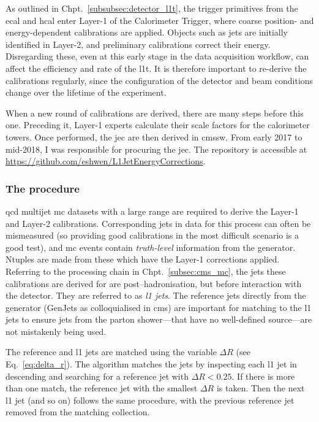 As outlined in Chpt.~\ref{subsubsec:detector_l1t}, the trigger primitives from the \acrshort{ecal} and \acrshort{hcal} enter Layer-1 of the Calorimeter Trigger, where coarse position- and energy-dependent calibrations are applied. Objects such as \glspl{jet} are initially identified in Layer-2, and preliminary calibrations correct their energy. Disregarding these, even at this early stage in the data acquisition workflow, can affect the efficiency and rate of the \acrlong{l1t}. It is therefore important to re-derive the calibrations regularly, since the configuration of the detector and beam conditions change over the lifetime of the experiment.

When a new round of calibrations are derived, there are many steps before this one. Preceding it, Layer-1 experts calculate their scale factors for the calorimeter towers. Once performed, the \acrlong{jec} are then derived in \acrshort{cmssw}. From early 2017 to mid-2018, I was responsible for procuring the \acrshort{jec}. The repository is accessible at \url{https://github.com/eshwen/L1JetEnergyCorrections}.




\subsubsection{The procedure}
\label{subsubsec:detector_jec_procedure}

\acrshort{qcd} multijet \acrshort{mc} datasets with a large \pt range are required to derive the Layer-1 and Layer-2 calibrations. Corresponding \glspl{jet} in data for this process can often be mismeasured (so providing good calibrations in the most difficult scenario is a good test), and \acrshort{mc} events contain \emph{truth-level} information from the generator. Ntuples are made from these which have the Layer-1 corrections applied. Referring to the processing chain in Chpt.~\ref{subsec:cms_mc}, the \glspl{jet} these calibrations are derived for are post--hadronisation, but before interaction with the detector. They are referred to as \emph{\acrfull{l1} \glspl{jet}}. The reference \glspl{jet} directly from the generator (GenJets as colloquialised in \acrshort{cms}) are important for matching to the \acrshort{l1} \glspl{jet} to ensure \glspl{jet} from the parton shower---that have no well-defined source---are not mistakenly being used.

The reference and \acrshort{l1} \glspl{jet} are matched using the variable $\Delta R$ (see Eq.~\ref{eq:delta_r}). The algorithm matches the \glspl{jet} by inspecting each \acrshort{l1} \gls{jet} in descending \pt and searching for a reference \gls{jet} with $\Delta R < \text{0.25}$. If there is more than one match, the reference \gls{jet} with the smallest $\Delta R$ is taken. Then the next \acrshort{l1} jet (and so on) follows the same procedure, with the previous reference \gls{jet} removed from the matching collection.

